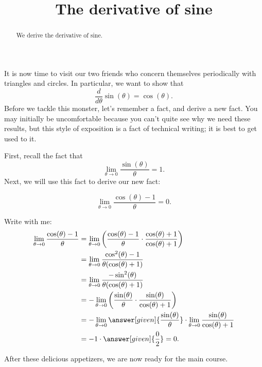 \documentclass{ximera}
\title[Dig-In:]{The derivative of sine}
\begin{document}
\begin{abstract}
  We derive the derivative of sine.
\end{abstract}
\maketitle

It is now time to visit our two friends who concern themselves
periodically with triangles and circles. In particular, we want to show that
\[
\frac{d}{d\theta}\sin(\theta)=\cos(\theta).
\]
Before we tackle this monster, let's remember a fact, and derive a new
fact. You may initially be uncomfortable because you can't quite see why we need
these results, but this style of exposition is a fact of technical writing; it
is best to get used to it.

First, recall the fact that
\[
\lim_{\theta\to 0} \frac{\sin(\theta)}{\theta} = 1. %
\]
Next, we will use this fact to derive our new fact:
\begin{example}
  \[
\lim_{\theta\to 0}\frac{\cos(\theta)-1}{\theta} = 0.
  \]
  \begin{explanation}
    Write with me:
\begin{align*}
\lim_{\theta\to 0}\frac{\cos(\theta)-1}{\theta} &= \lim_{\theta\to 0}\left(\frac{\cos(\theta)-1}{\theta}\cdot\frac{\cos(\theta)+1}{\cos(\theta)+1}\right)\\
&=\lim_{\theta\to 0}\frac{\cos^2(\theta)-1}{\theta(\cos(\theta)+1)}\\
&=\lim_{\theta\to 0}\frac{-\sin^2(\theta)}{\theta(\cos(\theta)+1)}\\
&=-\lim_{\theta\to 0}\left(\frac{\sin(\theta)}{\theta}\cdot\frac{\sin(\theta)}{\cos(\theta)+1}\right)\\
&=-\lim_{\theta\to 0}\answer[given]{\frac{\sin(\theta)}{\theta}} \cdot \lim_{\theta\to 0}\frac{\sin(\theta)}{\cos(\theta)+1}\\
&= -1 \cdot \answer[given]{\frac{0}{2}} = 0.
\end{align*}
  \end{explanation}
\end{example}

After these delicious appetizers, we are now ready for the main course.
\end{document}
